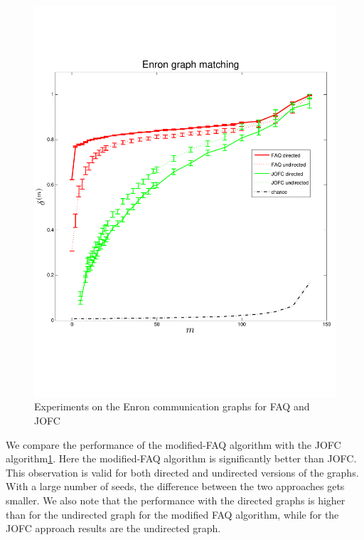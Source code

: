 \documentclass[12pt,oneside,final]{thesis}\usepackage[]{graphicx}\usepackage[]{color}
\begin{document}
\begin{figure}
\includegraphics[scale=0.75]{enron-JOFC-FAQ-paper.pdf}
\caption{Experiments on the Enron communication graphs for FAQ and JOFC \label{enron_graphmatch_faq_jofc}}
\end{figure}

We compare the performance of the modified-FAQ algorithm with the JOFC algorithm\ref{enron_graphmatch_faq_jofc}. Here the modified-FAQ algorithm is significantly better than JOFC. This observation  is valid for both directed and undirected versions of the graphs.  With a large  number of seeds, the difference between the two approaches gets smaller. We also note that the performance with the directed graphs is higher than for the undirected graph for the modified FAQ algorithm, while for the JOFC approach  results are   the undirected graph.
\end{document}
